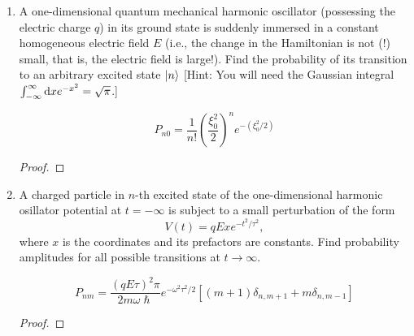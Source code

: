 \documentclass[a4paper]{article}
\begin{document}
\begin{enumerate}
\begin{ans}
\begin{proof}
\begin{align*}
{			\bket{\downarrow}}^2\\
	\intertext{The $\sigma_x$ term is the only one which we can't pull out
		of the braket, but we can simplify it:
		\[
			\brak{\uparrow}\sigma_x\bket{\downarrow} =
			\begin{pmatrix}1&0\end{pmatrix}
			\begin{pmatrix}0&1\\1&0\end{pmatrix}
			\begin{pmatrix}0\\1\end{pmatrix}
			= 1
		\]
		Thus, we can continue our simplification:
	}
	P_{\uparrow\downarrow}(t\to\infty) &= \frac{\omega_1^2}{4} 
		\abs{ \int_0^\infty
		e^{-t'\left(\frac{1}{\tau}-i\omega_0\right)}}^2\\
	&= \frac{\omega_1^2}{4}\frac{1}{\abs{\frac{1}{\tau}-i\omega_0}^2}\\
	P_{\uparrow\downarrow}(t\to\infty) &=
		\frac{(\omega_1\tau)^2}{4(\tau^2\omega_0^2+1)}
	\end{align*}
\end{proof}
\end{ans}

\item A one-dimensional quantum mechanical harmonic oscillator (possessing the
electric charge $q$) in its ground state is suddenly immersed in a constant
homogeneous electric field $E$ (i.e., the change in the Hamiltonian is not (!)
small, that is, the electric field is large!). Find the probability of its
transition to an arbitrary excited state $\left\lvert n\right\rangle$ [Hint: You will need the
Gaussian integral $\int_{-\infty}^\infty \mathrm{d} x e^{-x^2} = \sqrt{\pi}$.]
\begin{ans}
	\[
		P_{n0} = \frac{1}{n!}\left(\frac{\xi_0^2}{2}\right)^n
			e^{-(\xi_0^2/2)}
	\]
\begin{proof}
\end{proof}
\end{ans}

\item A charged particle in $n$-th excited state of the one-dimensional
harmonic osillator potential at $t=-\infty$ is subject to a small perturbation
of the form
	\[ V(t) = qExe^{-t^2/\tau^2}, \]
where $x$ is the coordinates and its prefactors are constants. Find probability
amplitudes for all possible transitions at $t\to\infty$.
\begin{ans}
	\[
		P_{nm} = \frac{(qE\tau)^2\pi}{2m\omega\hslash}
			e^{-\omega^2\tau^2/2}\left[
			(m+1)\delta_{n,m+1} + m\delta_{n,m-1}
			\right]
	\]
\begin{proof}
\end{proof}
\end{ans}
\end{enumerate}
\end{document}
